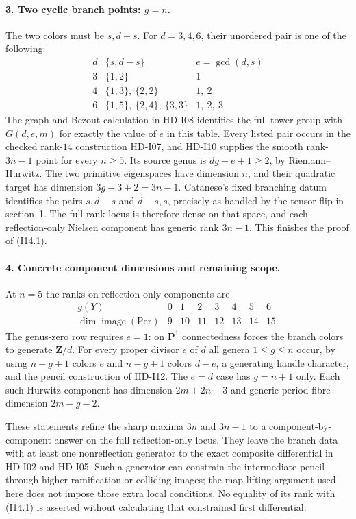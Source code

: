 \paragraph{3. Two cyclic branch points: $g=n$.}
The two colors must be $s,d-s$.  For $d=3,4,6$, their unordered pair is
one of the following:
\[
\begin{array}{c|c|c}
 d&\{s,d-s\}&e=\gcd(d,s)\\ \hline
 3&\{1,2\}&1\\
 4&\{1,3\},\ \{2,2\}&1,\ 2\\
 6&\{1,5\},\ \{2,4\},\ \{3,3\}&1,\ 2,\ 3
\end{array}
\]
The graph and Bezout calculation in HD-I08 identifies the full tower
group with $G(d,e,m)$ for exactly the value of $e$ in this table.
Every listed pair occurs in the checked rank-$14$ construction
HD-I07, and HD-I10 supplies the smooth rank-$3n-1$ point for every
$n\geq5$.  Its source genus is $dg-e+1\geq2$, by Riemann--Hurwitz.
The two primitive eigenspaces have dimension $n$, and their quadratic
target has dimension $3g-3+2=3n-1$.
Catanese's fixed branching datum identifies the pairs $s,d-s$ and
$d-s,s$, precisely as handled by the tensor flip in section~1.
The full-rank locus is therefore dense on that space, and each
reflection-only Nielsen component has generic rank $3n-1$.
This finishes the proof of (I14.1).

\paragraph{4. Concrete component dimensions and remaining scope.}
At $n=5$ the ranks on reflection-only components are
\[
\begin{array}{c|rrrrrrr}
 g(Y)&0&1&2&3&4&5&6\\ \hline
 \dim\operatorname{image}(\mathrm{Per})&9&10&11&12&13&14&15.
\end{array}
\]
The genus-zero row requires $e=1$: on $\mathbf P^1$ connectedness
forces the branch colors to generate $\mathbf Z/d$.
For every proper divisor $e$ of $d$ all genera $1\leq g\leq n$ occur,
by using $n-g+1$ colors $e$ and $n-g+1$ colors $d-e$, a generating
handle character, and the pencil construction of HD-I12.
The $e=d$ case has $g=n+1$ only.
Each such Hurwitz component has dimension $2m+2n-3$ and generic
period-fibre dimension $2m-g-2$.

These statements refine the sharp maxima $3n$ and $3n-1$ to a
component-by-component answer on the full reflection-only locus.
They leave the branch data with at least one nonreflection generator
to the exact composite differential in HD-I02 and HD-I05.  Such a
generator can constrain the intermediate pencil through higher
ramification or colliding images; the map-lifting argument used here
does not impose those extra local conditions.  No equality of its
rank with (I14.1) is asserted without calculating that constrained
first differential.

